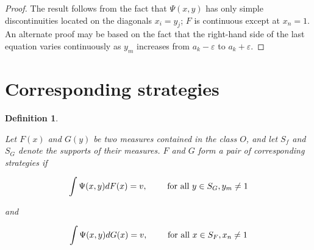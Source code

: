 \documentclass{article}
\newtheorem{definition}{Definition}
\begin{document}
\begin{proof}

The result follows from the fact that $\Psi(x, y)$ has only simple
discontinuities located on the diagonals $x_i = y_j$; $F$ is continuous except
at $x_n = 1$. An alternate proof may be based on the fact that the right-hand
side of the last equation varies continuously as $y_m$ increases from $a_k -
\varepsilon$ to $a_k + \varepsilon$.

\end{proof}

\section{Corresponding strategies}

\begin{definition} \label{defn:corresponding-strategies}

Let $F(x)$ and $G(y)$ be two measures contained in the class $O$, and let $S_f$
and $S_G$ denote the supports of their measures. $F$ and $G$ form a pair of
corresponding strategies if

\[
\int \Psi(x, y) dF(x) = v, \qquad \textup{ for all } y \in S_G, y_m \neq 1
\]

and

\[
\int \Psi(x, y) dG(x) = v, \qquad \textup{ for all } x \in S_F, x_n \neq 1
\]

\end{definition}
\end{document}
